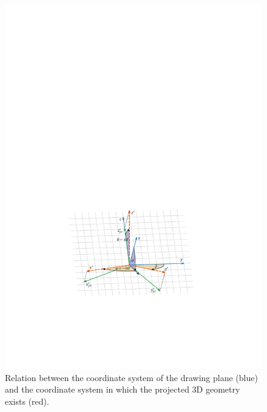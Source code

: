 \documentclass[11pt,a4paper]{article}
\begin{document}
\begin{figure}
\begin{center}
\includegraphics[scale=1]{pdf/projection_explained_2_v2.pdf}
\caption{Relation between the coordinate system of the drawing plane (blue) and the coordinate system in which the projected 3D geometry exists (red).}
\label{fig:projection_explained_2}
\end{center}
\end{figure}

\end{document}
